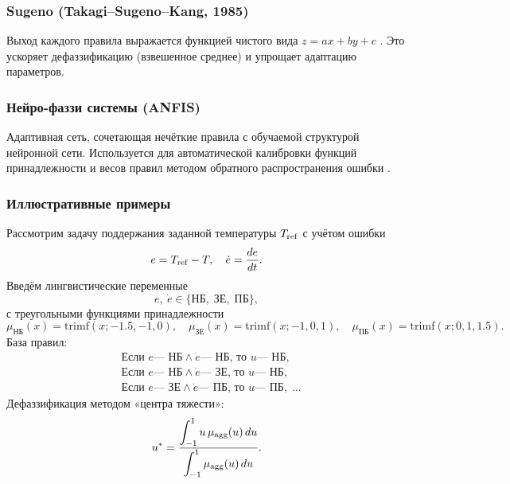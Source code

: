 \subsubsection{Sugeno (Takagi–Sugeno–Kang, 1985)}
Выход каждого правила выражается функцией чистого вида \(z = a x + b y + c\) \cite{Sugeno1985}. Это ускоряет дефаззификацию (взвешенное среднее) и упрощает адаптацию параметров.

\subsubsection{Нейро-фаззи системы (ANFIS)}
Адаптивная сеть, сочетающая нечёткие правила с обучаемой структурой нейронной сети. Используется для автоматической калибровки функций принадлежности и весов правил методом обратного распространения ошибки \cite{Jang1993}.

\subsubsection{Иллюстративные примеры}

\begin{example}
Рассмотрим задачу поддержания заданной температуры $T_{\rm ref}$ с учётом ошибки 
\[
  e = T_{\rm ref} - T,\quad 
  \dot e = \frac{de}{dt}.
\]
Введём лингвистические переменные
\[
  e,\ \dot e \in \{\text{НБ},\;\text{ЗЕ},\;\text{ПБ}\},
\]
с треугольными функциями принадлежности
\[
  \mu_{\mathrm{НБ}}(x)=\mathrm{trimf}(x; -1.5,-1,0),\quad
  \mu_{\mathrm{ЗЕ}}(x)=\mathrm{trimf}(x; -1,0,1),\quad
  \mu_{\mathrm{ПБ}}(x)=\mathrm{trimf}(x;0,1,1.5).
\]
База правил:
\[
\begin{aligned}
&\text{Если }e\text{— НБ}\land\dot e\text{— НБ, то }u\text{— НБ},\\
&\text{Если }e\text{— НБ}\land\dot e\text{— ЗЕ, то }u\text{— НБ},\\
&\text{Если }e\text{— ЗЕ}\land\dot e\text{— ПБ, то }u\text{— ПБ},\;\dots
\end{aligned}
\]
Дефаззификация методом «центра тяжести»:
\[
  u^* 
  = \frac{\displaystyle\int_{-1}^{1} u\,\mu_{\rm agg}(u)\,du}
         {\displaystyle\int_{-1}^{1}\mu_{\rm agg}(u)\,du}.
\]
\end{example}

